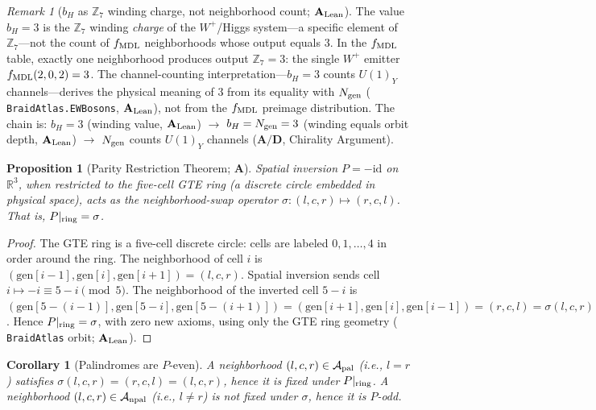 \documentclass[11pt]{article}
\newtheorem{proposition}[theorem]{Proposition}
\newtheorem{corollary}[theorem]{Corollary}
\theoremstyle{remark}
\newtheorem{remark}[theorem]{Remark}
\newcommand{\Ngen}{N_{\rm gen}}
\newcommand{\bH}{b_H}
\newcommand{\lean}[1]{%
  \penalty-100
  \begingroup\def\_{\textunderscore\allowbreak}\texttt{#1}\endgroup}
\newcommand{\CatA}{\textbf{A}}
\newcommand{\CatAL}{\ensuremath{\textbf{A}_{\rm Lean}}}
\newcommand{\CatAD}{\textbf{A/D}}
\begin{document}
\begin{remark}[$\bH$ as $\mathbb{Z}_7$ winding charge, not neighborhood count; $\CatAL$]
\label{rem:bh_winding_value}
The value $\bH = 3$ is the $\mathbb{Z}_7$ winding \emph{charge} of the $W^+$/Higgs
system---a specific element of $\mathbb{Z}_7$---not the count of $f_{\rm MDL}$
neighborhoods whose output equals $3$.
In the $f_{\rm MDL}$ table, exactly one neighborhood produces output
$\mathbb{Z}_7 = 3$: the single $W^+$ emitter $f_{\rm MDL}(2,0,2) = 3$.
The channel-counting interpretation---$\bH = 3$ counts $U(1)_Y$ channels---derives
the physical meaning of $3$ from its equality with $\Ngen$
(\lean{BraidAtlas.EWBosons}, $\CatAL$), not from the $f_{\rm MDL}$ preimage
distribution.
The chain is: $\bH = 3$ (winding value, $\CatAL$) $\to$ $\bH = \Ngen = 3$
(winding equals orbit depth, $\CatAL$) $\to$ $\Ngen$ counts $U(1)_Y$ channels
($\CatAD$, Chirality Argument).
\end{remark}

\begin{proposition}[Parity Restriction Theorem; $\CatA$]
\label{prop:parity_restriction}
Spatial inversion $P = -\mathrm{id}$ on $\mathbb{R}^3$, when restricted to the
five-cell GTE ring (a discrete circle embedded in physical space), acts as the
neighborhood-swap operator $\sigma: (l,c,r) \mapsto (r,c,l)$.
That is, $P|_{\rm ring} = \sigma$.
\end{proposition}

\begin{proof}
The GTE ring is a five-cell discrete circle: cells are labeled $0, 1, \ldots, 4$ in
order around the ring.  The neighborhood of cell $i$ is
$(\mathrm{gen}[i-1], \mathrm{gen}[i], \mathrm{gen}[i+1]) = (l, c, r)$.
Spatial inversion sends cell $i \mapsto -i \equiv 5 - i \pmod{5}$.
The neighborhood of the inverted cell $5 - i$ is
$(\mathrm{gen}[5-(i-1)], \mathrm{gen}[5-i], \mathrm{gen}[5-(i+1)])
 = (\mathrm{gen}[i+1], \mathrm{gen}[i], \mathrm{gen}[i-1]) = (r, c, l) = \sigma(l,c,r)$.
Hence $P|_{\rm ring} = \sigma$, with zero new axioms, using only the GTE ring geometry
(\lean{BraidAtlas} orbit; $\CatAL$).
\end{proof}

\begin{corollary}[Palindromes are $P$-even]
A neighborhood $(l,c,r) \in \mathcal{A}_{\rm pal}$ (i.e., $l = r$) satisfies
$\sigma(l,c,r) = (r,c,l) = (l,c,r)$, hence it is fixed under $P|_{\rm ring}$.
A neighborhood $(l,c,r) \in \mathcal{A}_{\rm npal}$ (i.e., $l \neq r$) is not
fixed under $\sigma$, hence it is $P$-odd.
\end{corollary}
\end{document}
